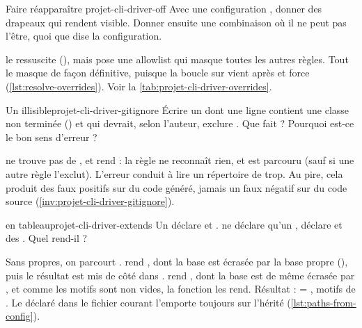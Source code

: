 \begin{exercice}{Faire réapparaître }{projet-cli-driver-off}
Avec une configuration , donner des drapeaux qui rendent  visible. Donner ensuite une combinaison où il ne peut pas l'être, quoi que dise la configuration.
\end{exercice}
\begin{solution}
 le ressuscite (), mais pose une allowlist qui masque toutes les autres règles. Tout  le masque de façon définitive, puisque la boucle sur  vient après et force  (\cref{lst:resolve-overrides}). Voir la \cref{tab:projet-cli-driver-overrides}.
\end{solution}

\begin{exercice}{Un  illisible}{projet-cli-driver-gitignore}
Écrire un  dont une ligne contient une classe non terminée (\code{gen[}) et qui devrait, selon l'auteur, exclure . Que fait \reactant{} ? Pourquoi est-ce le bon sens d'erreur ?
\end{exercice}
\begin{solution}
 ne trouve pas de \code{]}, et  rend  : la règle ne reconnaît rien, et  est parcouru (sauf si une autre règle l'exclut). L'erreur conduit à lire un répertoire de trop. Au pire, cela produit des faux positifs sur du code généré, jamais un faux négatif sur du code source (\cref{inv:projet-cli-driver-gitignore}).
\end{solution}

\begin{exercice}{ en tableau}{projet-cli-driver-extends}
Un  déclare  et .  ne déclare qu'un ,  déclare  et des . Quel   rend-il ?
\end{exercice}
\begin{solution}
Sans  propres, on parcourt .  rend , dont la base est écrasée par la base propre  (), puis le résultat est mis de côté dans .  rend , dont la base est de même écrasée par , et comme les motifs sont non vides, la fonction les rend. Résultat :  = , motifs de . Le  déclaré dans le fichier courant l'emporte toujours sur l'hérité (\cref{lst:paths-from-config}).
\end{solution}

